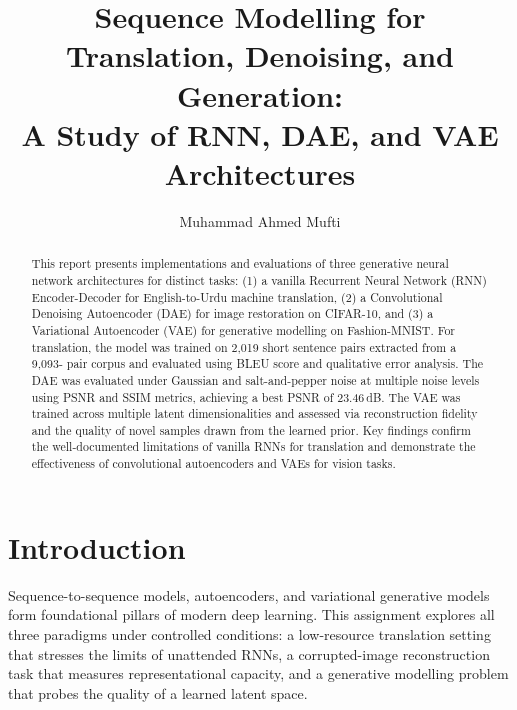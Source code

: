 \documentclass[runningheads]{llncs}
\begin{document}
\title{Sequence Modelling for Translation, Denoising, and Generation:\\
       A Study of RNN, DAE, and VAE Architectures}

\author{Muhammad Ahmed Mufti}


\maketitle

\begin{abstract}
This report presents implementations and evaluations of three generative
neural network architectures for distinct tasks: (1) a vanilla
Recurrent Neural Network (RNN) Encoder-Decoder for English-to-Urdu
machine translation, (2) a Convolutional Denoising Autoencoder (DAE)
for image restoration on CIFAR-10, and (3) a Variational Autoencoder
(VAE) for generative modelling on Fashion-MNIST. For translation, the
model was trained on 2,019 short sentence pairs extracted from a 9,093-
pair corpus and evaluated using BLEU score and qualitative error
analysis. The DAE was evaluated under Gaussian and salt-and-pepper
noise at multiple noise levels using PSNR and SSIM metrics, achieving
a best PSNR of 23.46\,dB. The VAE was trained across multiple latent
dimensionalities and assessed via reconstruction fidelity and the
quality of novel samples drawn from the learned prior. Key findings
confirm the well-documented limitations of vanilla RNNs for translation
and demonstrate the effectiveness of convolutional autoencoders and
VAEs for vision tasks.
\end{abstract}

\section{Introduction}

Sequence-to-sequence models, autoencoders, and variational generative
models form foundational pillars of modern deep learning. This
assignment explores all three paradigms under controlled conditions:
a low-resource translation setting that stresses the limits of
unattended RNNs, a corrupted-image reconstruction task that measures
representational capacity, and a generative modelling problem that
probes the quality of a learned latent space.
\end{document}
